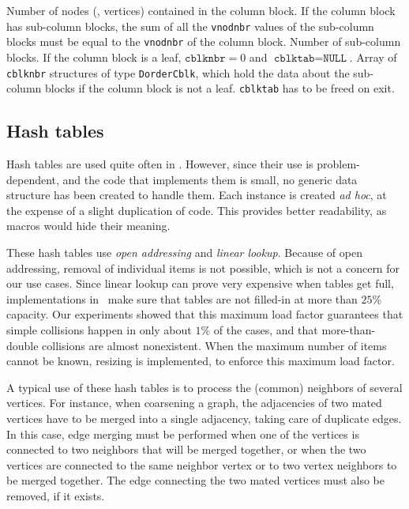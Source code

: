 \begin{itemize}
\begin{itemize}
  \end{itemize}
  Number of nodes (\ie, vertices) contained in the column block. If
  the column block has sub-column blocks, the sum of all the
  \texttt{vnodnbr} values of the sub-column blocks must be equal to
  the \texttt{vnodnbr} of the column block.
  Number of sub-column blocks. If the column block is a leaf,
  $\texttt{cblknbr} = 0$ and $\texttt{cblktab} = \texttt{NULL}$.
  Array of \texttt{cblknbr} structures of type \texttt{DorderCblk},
  which hold the data about the sub-column blocks if the column block
  is not a leaf. \texttt{cblktab} has to be freed on exit.
\end{itemize}

\subsection{Hash tables}
\label{sec-type-hash-table}

Hash tables are used quite often in \scotch. However, since their use
is problem-dependent, and the code that implements them is small, no
generic data structure has been created to handle them. Each instance
is created \textit{ad hoc}, at the expense of a slight duplication of
code. This provides better readability, as macros would hide their
meaning.

These hash tables use \textit{open addressing} and \textit{linear
lookup}. Because of open addressing, removal of individual items is
not possible, which is not a concern for our use cases. Since linear
lookup can prove very expensive when tables get full, implementations
in \scotch\ make sure that tables are not filled-in at more than
$25$\% capacity. Our experiments showed that this maximum load factor
guarantees that simple collisions happen in only about $1$\% of the
cases, and that more-than-double collisions are almost
nonexistent. When the maximum number of items cannot be known,
resizing is implemented, to enforce this maximum load factor.

A typical use of these hash tables is to process the (common)
neighbors of several vertices. For instance, when coarsening a graph,
the adjacencies of two mated vertices have to be merged into a single
adjacency, taking care of duplicate edges. In this case, edge merging
must be performed when one of the vertices is connected to two
neighbors that will be merged together, or when the two vertices are
connected to the same neighbor vertex or to two vertex neighbors to
be merged together. The edge connecting the two mated vertices must
also be removed, if it exists.

